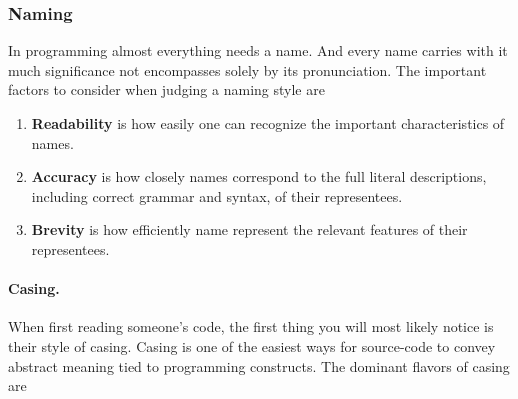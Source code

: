 \documentclass{article}
\begin{document}
\subsubsection{Naming}

	In programming almost everything needs a name. And every name carries with it much significance not encompasses solely by its pronunciation. The important factors to consider when judging a naming style are

	\begin{enumerate}
		\item \textbf{Readability} is how easily one can recognize the important characteristics of names.
		\item \textbf{Accuracy} is how closely names correspond to the full literal descriptions, including correct grammar and syntax, of their representees.
		\item \textbf{Brevity} is how efficiently name represent the relevant features of their representees.
	\end{enumerate}

	\paragraph{Casing.} When first reading someone's code, the first thing you will most likely notice is their style of casing. Casing is one of the easiest ways for source-code to convey abstract meaning tied to programming constructs. The dominant flavors of casing are
\end{document}

